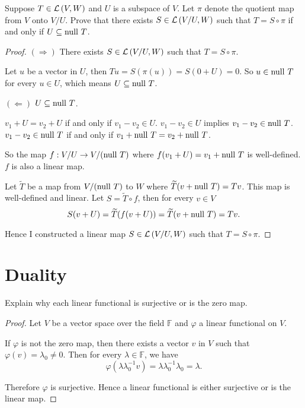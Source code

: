 \begin{exercise}
    Suppose $T\in\mathcal{L}\left({V, W}\right)$ and $U$ is a subspace of $V$. Let $\pi$ denote the quotient map from $V$ onto $V/U$. Prove that there exists $S\in\mathcal{L}\left({V/U, W}\right)$ such that $T = S\circ \pi$ if and only if $U\subseteq \operatorname{null}\,{T}$.
\end{exercise}

\begin{proof}
    $(\Rightarrow)$ There exists $S\in\mathcal{L}\left({V/U, W}\right)$ such that $T = S\circ \pi$.

    Let $u$ be a vector in $U$, then $Tu = S(\pi(u)) = S(0 + U) = 0$. So $u\in \operatorname{null}\,{T}$ for every $u\in U$, which means $U\subseteq \operatorname{null}\,{T}$.

    $(\Leftarrow)$ $U\subseteq \operatorname{null}\,{T}$.

    $v_{1} + U = v_{2} + U$ if and only if $v_{1} - v_{2}\in U$. $v_{1} - v_{2}\in U$ implies $v_{1} - v_{2}\in \operatorname{null}\,{T}$. $v_{1} - v_{2}\in \operatorname{null}\,{T}$ if and only if $v_{1} + \operatorname{null}\,{T} = v_{2} + \operatorname{null}\,{T}$.

    So the map $f: V/U\to V/(\operatorname{null}\,{T})$ where $f(v_{1} + U) = v_{1} + \operatorname{null}\,{T}$ is well-defined. $f$ is also a linear map.

    Let $\widetilde{T}$ be a map from $V/(\operatorname{null}\,{T})$ to $W$ where $\widetilde{T}(v + \operatorname{null}\,{T}) = Tv$. This map is well-defined and linear. Let $S = \widetilde{T}\circ f$, then for every $v\in V$
    \[
        S(v + U) = \widetilde{T}(f(v + U)) = \widetilde{T}(v + \operatorname{null}\,{T}) = Tv.
    \]

    Hence I constructed a linear map $S\in\mathcal{L}\left({V/U, W}\right)$ such that $T = S\circ \pi$.
\end{proof}
\newpage

\section{Duality}

\begin{exercise}\label{chapter3:sectionF:exercise1}
    Explain why each linear functional is surjective or is the zero map.
\end{exercise}

\begin{proof}
    Let $V$ be a vector space over the field $\mathbb{F}$ and $\varphi$ a linear functional on $V$.

    If $\varphi$ is not the zero map, then there exists a vector $v$ in $V$ such that $\varphi(v) = \lambda_{0}\ne 0$. Then for every $\lambda\in\mathbb{F}$, we have
    \[
        \varphi(\lambda\lambda_{0}^{-1}v) = \lambda\lambda_{0}^{-1}\lambda_{0} = \lambda.
    \]

    Therefore $\varphi$ is surjective. Hence a linear functional is either surjective or is the linear map.
\end{proof}
\newpage


